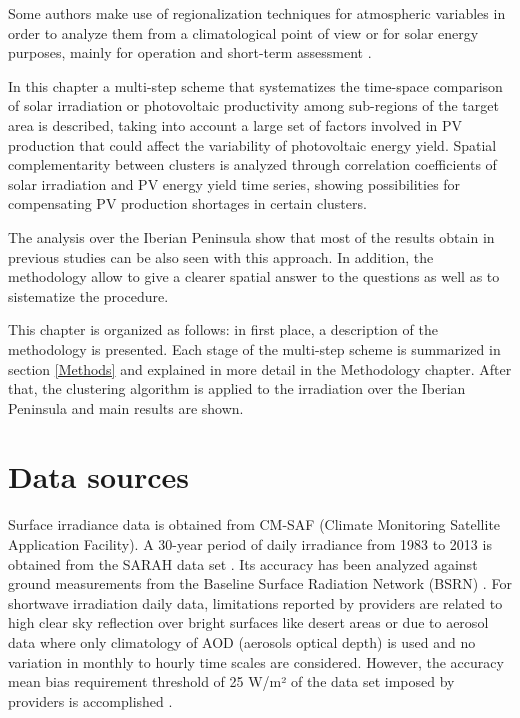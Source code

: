 Some authors make use of regionalization techniques for atmospheric variables in order to analyze them from a climatological point of view \cite*{Argueso2011} or for solar energy purposes, mainly for operation and short-term assessment \cite*{Zagouras2013, Zagouras2014, Zagouras2014b}.

In this chapter a multi-step scheme that systematizes the time-space comparison of solar irradiation or photovoltaic productivity among sub-regions of the target area is described, taking into account a large set of factors involved in PV production that could affect the variability of photovoltaic energy yield. Spatial complementarity between clusters is analyzed through correlation coefficients of solar irradiation and PV energy yield time series, showing possibilities for compensating PV production shortages in certain clusters.

The analysis over the Iberian Peninsula show that most of the results obtain in previous studies can be also seen with this approach. In addition, the methodology allow to give a clearer spatial answer to the questions as well as to sistematize the procedure.

This chapter is organized as follows: in first place, a description of the methodology is presented. Each stage of the multi-step scheme is summarized in section \ref{Methods} and explained in more detail in the Methodology chapter. After that, the clustering algorithm is applied to the irradiation over the Iberian Peninsula and main results are shown.

\section{Data sources}

Surface irradiance data is obtained from CM-SAF (Climate Monitoring Satellite Application Facility). A 30-year period of daily irradiance from 1983 to 2013 is obtained from the SARAH data set \cite*{Muller2015}. Its accuracy has been analyzed \cite*{Posselt2012, Muller2015} against ground measurements from the Baseline Surface Radiation Network (BSRN) \cite*{ohmura1998}. For shortwave irradiation daily data, limitations reported by providers are related to high clear sky reflection over bright surfaces like desert areas or due to aerosol data where only climatology of AOD (aerosols optical depth) is used and no variation in monthly to hourly time scales are considered. However, the accuracy mean bias requirement threshold of 25 W/m² of the data set imposed by providers is accomplished \cite*{Posselt2012, Muller2015}. 

